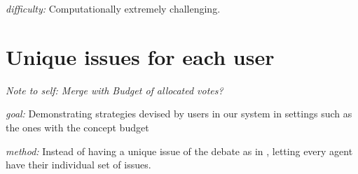 \documentclass{article}
\begin{document}
\textit{difficulty:} Computationally extremely challenging. 







\begin{comment}
\section{Efficient algorithms for computing solutions}
Prof.Leite has mentioned on the current state of our framework regarding the algorithms for computing the models of the system. That the study focused mainly on four algorithms, that it had become apparent in early phases that two dominated the rest performance-wise. And between these two, one performs slightly better for small systems of low attack density and the other one scales better. And currently the results are satisfying in the sense that with these algorithms that one can solve(approximate) big systems(consisting of roughly a thousand arguments) under a second.
\end{comment}

\section{Unique issues for each user}
\textit{Note to self: Merge with Budget of allocated votes?}

\textit{goal:} Demonstrating strategies devised by users in our system in settings such as the ones with the concept budget 

\textit{method:} Instead of having a unique issue of the debate as in \cite{bonzonmaudet11}, letting every agent have their individual set of issues.




\end{document}
